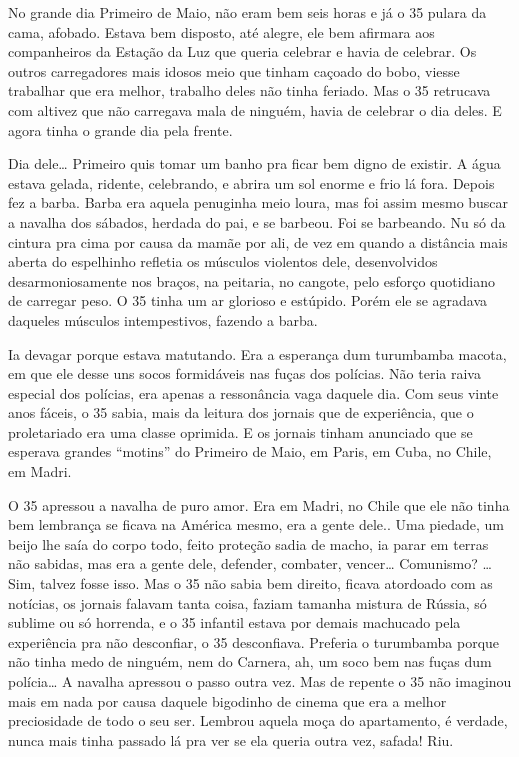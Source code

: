 \begin{linenumbers}
No grande dia Primeiro de Maio, não eram bem seis horas e já o 35 pulara
da cama, afobado. Estava bem disposto, até alegre, ele bem afirmara aos
companheiros da Estação da Luz que queria celebrar e havia de celebrar.
Os outros carregadores mais idosos meio que tinham caçoado do bobo,
viesse trabalhar que era melhor, trabalho deles não tinha feriado. Mas o
35 retrucava com altivez que não carregava mala de ninguém, havia de
celebrar o dia deles. E agora tinha o grande dia pela frente.

Dia dele\ldots{} Primeiro quis tomar um banho pra ficar bem digno de existir.
A água estava gelada, ridente, celebrando, e abrira um sol enorme e frio
lá fora. Depois fez a barba. Barba era aquela penuginha meio loura, mas
foi assim mesmo buscar a navalha dos sábados, herdada do pai, e se
barbeou. Foi se barbeando. Nu só da cintura pra cima por causa da mamãe
por ali, de vez em quando a distância mais aberta do espelhinho refletia
os músculos violentos dele, desenvolvidos desarmoniosamente nos braços,
na peitaria, no cangote, pelo esforço quotidiano de carregar peso. O 35
tinha um ar glorioso e estúpido. Porém ele se agradava daqueles músculos
intempestivos, fazendo a barba.

Ia devagar porque estava matutando. Era a esperança dum turumbamba
macota, em que ele desse uns socos formidáveis nas fuças dos polícias.
Não teria raiva especial dos polícias, era apenas a ressonância vaga
daquele dia. Com seus vinte anos fáceis, o 35 sabia, mais da leitura dos
jornais que de experiência, que o proletariado era uma classe oprimida.
E os jornais tinham anunciado que se esperava grandes ``motins'' do
Primeiro de Maio, em Paris, em Cuba, no Chile, em Madri.

O 35 apressou a navalha de puro amor. Era em Madri, no Chile que ele não
tinha bem lembrança se ficava na América mesmo, era a gente dele.. Uma
piedade, um beijo lhe saía do corpo todo, feito proteção sadia de macho,
ia parar em terras não sabidas, mas era a gente dele, defender,
combater, vencer\ldots{} Comunismo? \ldots{} Sim, talvez fosse isso. Mas o 35 não
sabia bem direito, ficava atordoado com as notícias, os jornais falavam
tanta coisa, faziam tamanha mistura de Rússia, só sublime ou só
horrenda, e o 35 infantil estava por demais machucado pela experiência
pra não desconfiar, o 35 desconfiava. Preferia o turumbamba porque não
tinha medo de ninguém, nem do Carnera, ah, um soco bem nas fuças dum
polícia\ldots{} A navalha apressou o passo outra vez. Mas de repente o 35 não
imaginou mais em nada por causa daquele bigodinho de cinema que era a
melhor preciosidade de todo o seu ser. Lembrou aquela moça do
apartamento, é verdade, nunca mais tinha passado lá pra ver se ela
queria outra vez, safada! Riu.


\end{linenumbers}
